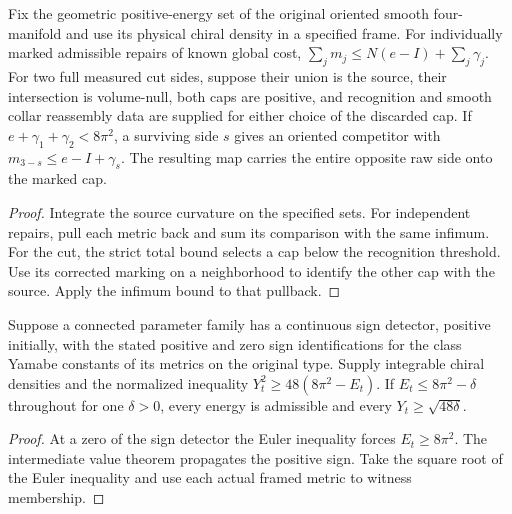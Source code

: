 \begin{proposition}
\label{prop:ed03-measured-comparisons}
\leanok
Fix the geometric positive-energy set of the original oriented smooth
four-manifold and use its physical chiral density in a specified frame.
For individually marked admissible repairs of known global cost,
\(\sum_j m_j\le N(e-I)+\sum_j\gamma_j\).
For two full measured cut sides, suppose their union is the source,
their intersection is volume-null, both caps are positive, and recognition
and smooth collar reassembly data are supplied for either choice of the
discarded cap. If \(e+\gamma_1+\gamma_2<8\pi^2\), a surviving side
\(s\) gives an oriented competitor with
\(m_{3-s}\le e-I+\gamma_s\). The resulting map carries the entire
opposite raw side onto the marked cap.
\end{proposition}
\begin{proof}
\leanok
Integrate the source curvature on the specified sets. For independent repairs,
pull each metric back and sum its comparison with the same infimum.
For the cut, the strict total bound selects a cap below the recognition
threshold. Use its corrected marking on a neighborhood to identify the
other cap with the source. Apply the infimum bound to that pullback.
\end{proof}

\begin{lemma}
\label{lem:ed03-path}
\leanok
Suppose a connected parameter family has a continuous sign detector,
positive initially, with the stated positive and zero sign identifications
for the class Yamabe constants of its metrics on the original type.
Supply integrable chiral densities and the normalized inequality
\(Y_t^2\ge48(8\pi^2-E_t)\).
If \(E_t\le8\pi^2-\delta\) throughout for one \(\delta>0\), every energy
is admissible and every \(Y_t\ge\sqrt{48\delta}\).
\end{lemma}
\begin{proof}
\leanok
At a zero of the sign detector the Euler inequality forces
\(E_t\ge8\pi^2\). The intermediate value theorem propagates the positive
sign. Take the square root of the Euler inequality and use each actual
framed metric to witness membership.
\end{proof}


